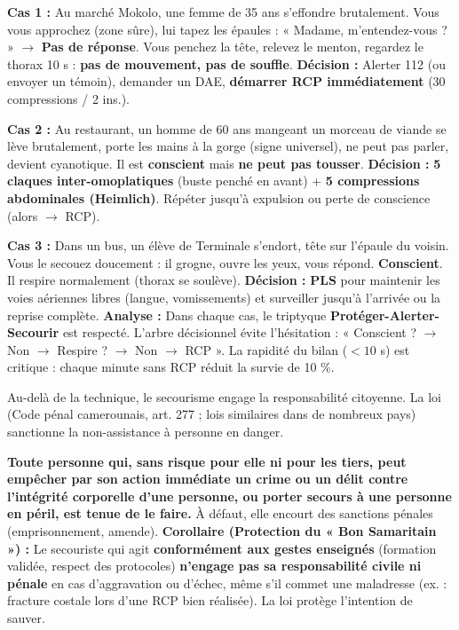 \documentclass[11pt]{article}
\newcommand{\cle}[1]{{\popxbold\color{popdark}#1}}
\newcounter{popsec}
\newcounter{popsub}
\newcommand{\courssub}[1]{%
  \stepcounter{popsub}%
  \par\vspace{9pt}\noindent{\popxbold\fontsize{11.5}{13}\selectfont\color{popink}{\color{poporange}\thepopsec.\thepopsub}\hspace{6pt}#1}\par\nopagebreak\vspace{4pt}
}
\begin{document}
\begin{exoresolu}
\textbf{Cas 1 :} Au marché Mokolo, une femme de 35 ans s'effondre brutalement. Vous vous approchez (zone sûre), lui tapez les épaules : « Madame, m'entendez-vous ? » $\rightarrow$ \textbf{Pas de réponse}. Vous penchez la tête, relevez le menton, regardez le thorax 10 s : \textbf{pas de mouvement, pas de souffle}. \textbf{Décision :} Alerter 112 (ou envoyer un témoin), demander un DAE, \textbf{démarrer RCP immédiatement} (30 compressions / 2 ins.).

\textbf{Cas 2 :} Au restaurant, un homme de 60 ans mangeant un morceau de viande se lève brutalement, porte les mains à la gorge (signe universel), ne peut pas parler, devient cyanotique. Il est \textbf{conscient} mais \textbf{ne peut pas tousser}. \textbf{Décision :} \textbf{5 claques inter-omoplatiques} (buste penché en avant) + \textbf{5 compressions abdominales (Heimlich)}. Répéter jusqu'à expulsion ou perte de conscience (alors $\rightarrow$ RCP).

\textbf{Cas 3 :} Dans un bus, un élève de Terminale s'endort, tête sur l'épaule du voisin. Vous le secouez doucement : il grogne, ouvre les yeux, vous répond. \textbf{Conscient}. Il respire normalement (thorax se soulève). \textbf{Décision :} \textbf{PLS} pour maintenir les voies aériennes libres (langue, vomissements) et surveiller jusqu'à l'arrivée ou la reprise complète.
\tcblower
\textbf{Analyse :} Dans chaque cas, le triptyque \textbf{Protéger-Alerter-Secourir} est respecté. L'arbre décisionnel évite l'hésitation : « Conscient ? $\rightarrow$ Non $\rightarrow$ Respire ? $\rightarrow$ Non $\rightarrow$ RCP ». La rapidité du bilan ($< 10$ s) est critique : chaque minute sans RCP réduit la survie de 10 \%.
\end{exoresolu}

\courssub{Protection juridique et morale : le devoir d'agir}

Au-delà de la technique, le secourisme engage la \cle{responsabilité citoyenne}. La loi (Code pénal camerounais, art. 277 ; lois similaires dans de nombreux pays) sanctionne la \cle{non-assistance à personne en danger}.

\begin{propriete}
\textbf{Toute personne qui, sans risque pour elle ni pour les tiers, peut empêcher par son action immédiate un crime ou un délit contre l'intégrité corporelle d'une personne, ou porter secours à une personne en péril, est tenue de le faire.} À défaut, elle encourt des sanctions pénales (emprisonnement, amende).
\textbf{Corollaire (Protection du « Bon Samaritain ») :} Le secouriste qui agit \textbf{conformément aux gestes enseignés} (formation validée, respect des protocoles) \textbf{n'engage pas sa responsabilité civile ni pénale} en cas d'aggravation ou d'échec, même s'il commet une maladresse (ex. : fracture costale lors d'une RCP bien réalisée). La loi protège l'intention de sauver.
\end{propriete}
\end{document}

